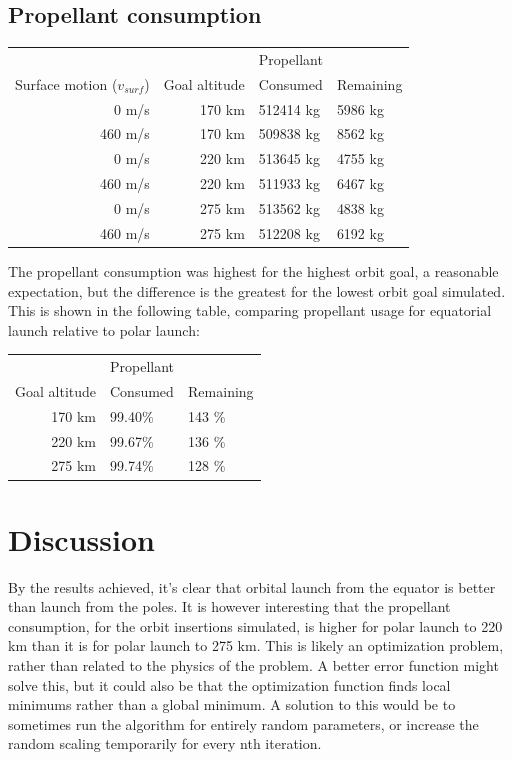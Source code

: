 \documentclass[11pt]{article}
\begin{document}
\subsection{Propellant consumption}
\begin{center}
  \begin{tabular}{ r | r  | l  l  }
     &   &   Propellant   \\
    Surface motion ($v_{surf}$)  &  Goal altitude & Consumed & Remaining \\
    \hline
    0 m/s & 170 km & 512414 kg & 5986 kg \\
    460 m/s & 170 km & 509838 kg & 8562 kg \\
    \hline
    0 m/s & 220 km & 513645 kg & 4755 kg \\
    460 m/s & 220 km  & 511933 kg & 6467 kg \\
    \hline
    0 m/s & 275 km & 513562 kg & 4838 kg \\
    460 m/s & 275 km & 512208 kg & 6192 kg
  \end{tabular}
\end{center}
The propellant consumption was highest for the highest orbit goal, a reasonable expectation, but the difference is the greatest for the lowest orbit goal simulated.
This is shown in the following table, comparing propellant usage for equatorial launch relative to polar launch:
\begin{center}
  \begin{tabular}{ r | l  l  }
     &   Propellant   \\
    Goal altitude & Consumed & Remaining \\
    \hline
    170 km & 99.40\% & 143 \% \\
    220 km & 99.67\% & 136 \% \\
    275 km & 99.74\% & 128 \%
  \end{tabular}
\end{center}



\section{Discussion}

By the results achieved, it's clear that orbital launch from the equator is better than launch from the poles. 
It is however interesting that the propellant consumption, for the orbit insertions simulated, is higher for polar launch to 220 km than it is for polar launch to 275 km.
This is likely an optimization problem, rather than related to the physics of the problem. A better error function might solve this,
but it could also be that the optimization function finds local minimums rather than a global minimum. 
A solution to this would be to sometimes run the algorithm for entirely random parameters, or increase the random scaling temporarily for every nth iteration. 
\end{document}
